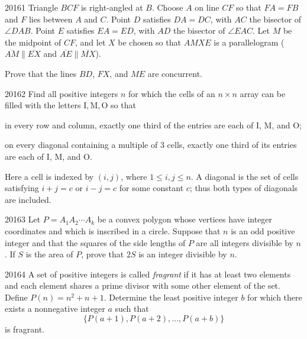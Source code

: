 
\begin{problem}{2016}{1}
Triangle $BCF$ is right-angled at $B$. Choose $A$ on line $CF$ so that $FA=FB$ and $F$ lies between $A$ and $C$. Point $D$ satisfies $DA=DC$, with $AC$ the bisector of $\angle DAB$. Point $E$ satisfies $EA=ED$, with $AD$ the bisector of $\angle EAC$. Let $M$ be the midpoint of $CF$, and let $X$ be chosen so that $AMXE$ is a parallelogram ($\overline{AM}\parallel\overline{EX}$ and $\overline{AE}\parallel\overline{MX}$).

Prove that the lines $BD$, $FX$, and $ME$ are concurrent.
\end{problem}

\begin{problem}{2016}{2}
Find all positive integers $n$ for which the cells of an $n\times n$ array can be filled with the letters $\mathrm{I}, \mathrm{M}, \mathrm{O}$ so that
\begin{problemclauses}
    \item in every row and column, exactly one third of the entries are each of $\mathrm{I}$, $\mathrm{M}$, and $\mathrm{O}$;
    \item on every diagonal containing a multiple of $3$ cells, exactly one third of its entries are each of $\mathrm{I}$, $\mathrm{M}$, and $\mathrm{O}$.
\end{problemclauses}
Here a cell is indexed by $(i, j)$, where $1\leq i, j\leq n$. A diagonal is the set of cells satisfying $i+j=c$ or $i-j=c$ for some constant $c$; thus both types of diagonals are included.
\end{problem}

\begin{problem}{2016}{3}
Let $P=A_1A_2\cdots A_k$ be a convex polygon whose vertices have integer coordinates and which is inscribed in a circle. Suppose that $n$ is an odd positive integer and that the squares of the side lengths of $P$ are all integers divisible by $n$. If $S$ is the area of $P$, prove that $2S$ is an integer divisible by $n$.
\end{problem}

\begin{problem}{2016}{4}
A set of positive integers is called \emph{fragrant} if it has at least two elements and each element shares a prime divisor with some other element of the set. Define $P(n)=n^2+n+1$. Determine the least positive integer $b$ for which there exists a nonnegative integer $a$ such that
\[
    \{P(a+1), P(a+2), \dots, P(a+b)\}
\]
is fragrant.
\end{problem}

